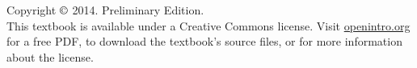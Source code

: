 \chapter*{}
\vfill

\noindent Copyright $\copyright$ 2014. Preliminary Edition. \\

\noindent This textbook is available under a Creative Commons license. Visit \href{http://www.openintro.org/stat/textbook.php}{openintro.org} for a free PDF, to download the textbook's source files, or for more information about the license. \\


